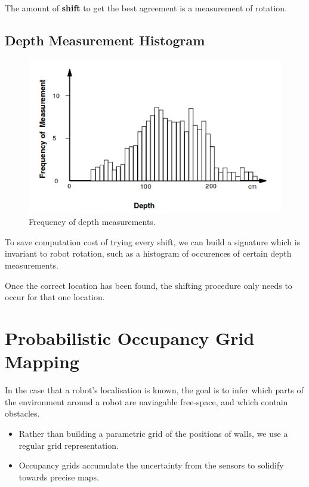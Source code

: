 \documentclass[11pt]{article}
\begin{document}
The amount of \textbf{shift} to get the best agreement is a measurement of rotation.

\subsection{Depth Measurement Histogram}
\begin{figure}[h]
  \caption{Frequency of depth measurements.}
  \includegraphics[scale=0.4]{freqdepth}
  \centering
\end{figure}
To save computation cost of trying every shift, we can build a signature which is invariant to robot rotation, such as a histogram of occurences of certain depth measurements.

Once the correct location has been found, the shifting procedure only needs to occur for that one location.

\section{Probabilistic Occupancy Grid Mapping}
In the case that a robot's localisation is known, the goal is to infer which parts of the environment around a robot are naviagable free-space, and which contain obstacles.

\begin{itemize}
  \item Rather than building a parametric grid of the positions of walls, we use a regular grid representation.
  \item Occupancy grids accumulate the uncertainty from the sensors to solidify towards precise maps.
\end{itemize}
\end{document}
